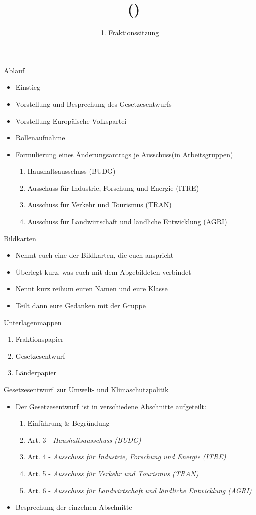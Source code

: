 \documentclass{beamer}
\title{\Fraktionsname\ (\Fraktionskuerzel)}
\subtitle{1. Fraktionssitzung}
\date{\datum}
\newcommand{\Fraktionsname}{Europäische Volkspartei}
\newcommand{\Fraktionsname}{Progressive Allianz der Sozialdemokraten}
\newcommand{\Fraktionsname}{Renew Europe}
\newcommand{\Fraktionsname}{Die Grünen/Europäische Freie Allianz}
\newcommand{\Fraktionsname}{Patrioten für Europa}
\newcommand{\Fraktionsname}{Die Linke}
\newcommand{\ausschuesse}{
   		     \begin{enumerate}
        		    \item Haushaltsausschuss (BUDG)
            		\item Ausschuss für Industrie, Forschung und Energie (ITRE)
    	    		\item Ausschuss für Verkehr und Tourismus (TRAN)
    		        \item Ausschuss für Landwirtschaft und ländliche Entwicklung (AGRI)
	        \end{enumerate}
		}
\newcommand{\ausschussgruppen}{
        		\item Art. 3 - \textit{Haushaltsausschuss (BUDG)}
       		    \item Art. 4 - \textit{Ausschuss für Industrie, Forschung und Energie (ITRE)}
      		    \item Art. 5 - \textit{Ausschuss für Verkehr und Tourismus (TRAN)}
      		    \item Art. 6 - \textit{Ausschuss für Landwirtschaft und ländliche Entwicklung (AGRI)}
	    }
\newcommand{\entwurf}{Gesetzesentwurf}
\newcommand{\policy}{Umwelt- und Klimaschutzpolitik}
\newcommand{\ausschuesse}{
            \begin{enumerate}
                \item Haushaltsausschuss (BUDG)
				\item Ausschuss für Beschäftigung und soziale Angelegenheiten (EMPL)
                \item Unterausschuss für Menschenrechte (DROI)
				\item Ausschuss für bürgerliche Freiheiten, Justiz und Inneres (LIBE)
            \end{enumerate}
    		}
\newcommand{\ausschussgruppen}{
                \item Art. 3 - \textit{Haushaltsausschuss (BUDG)}
				\item Art. 4 - \textit{Ausschuss für Beschäftigung und soziale Angelegenheiten (EMPL)}
                \item Art. 5 - \textit{Unterausschuss für Menschenrechte (DROI)}
				\item Art. 6 - \textit{Ausschuss für bürgerliche Freiheiten, Justiz und Inneres (LIBE)}
    		}
\newcommand{\entwurf}{Gesetzesentwurf}
\newcommand{\policy}{Asylpolitik}
\newcommand{\ausschuesse}{
            \begin{enumerate}
                \item Haushaltsausschuss (BUDG)
                \item Ausschuss für bürgerliche Freiheiten, Justiz und Inneres (LIBE)
                \item Ausschuss für Sicherheit und Verteidigung (SEDE)
            \end{enumerate}
    		}
\newcommand{\ausschussgruppen}{
            		\item Finanzierung - \newline \textit{Haushaltsausschuss (BUDG)}
	            	\item Dienstrecht - \newline \textit{Ausschuss für bürgerliche Freiheiten, Justiz und Inneres (LIBE)}
    		        \item Gegenstand und Ziele - \textit{Ausschuss für Sicherheit und Verteidigung (SEDE)}
	    	}
\newcommand{\entwurf}{Entschließungsentwurf}
\newcommand{\policy}{Außen- und Sicherheitspolitik}
\begin{document}
\frame{\titlepage}

\begin{frame}{Ablauf}
\vspace{-1.5cm}
\begin{itemize}
    \item Einstieg
    \item Vorstellung und Besprechung des \entwurf s
    \item Vorstellung \Fraktionsname
    \item Rollenaufnahme
    \item Formulierung eines Änderungsantrags je Ausschuss\newline (in Arbeitsgruppen)
    \ausschuesse
\end{itemize}
\end{frame}

\begin{frame}{Bildkarten}
\vspace{-1cm}
\begin{itemize}
    \item Nehmt euch eine der Bildkarten, die euch anspricht
    \item Überlegt kurz, was euch mit dem Abgebildeten verbindet
    \item Nennt kurz reihum euren Namen und eure Klasse
    \item Teilt dann eure Gedanken mit der Gruppe
\end{itemize}
\end{frame}

\begin{frame}{Unterlagenmappen}
\vspace{-1cm}
\begin{enumerate}
    \item Fraktionspapier
    \item \entwurf
    \item Länderpapier
\end{enumerate}
\end{frame}

\begin{frame}{\entwurf\ zur \policy}
\vspace{-1cm}
\begin{itemize}
	\item Der \entwurf\ ist in verschiedene Abschnitte aufgeteilt:
	\begin{enumerate}
		\item Einführung \& Begründung
		\ausschussgruppen	
	\end{enumerate}
	\item Besprechung der einzelnen Abschnitte
\end{itemize}
\end{frame}
\end{document}
